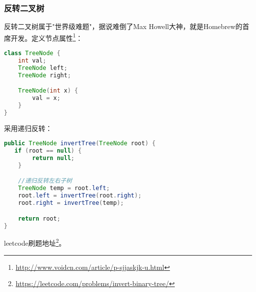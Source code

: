 \documentclass[../../../interview-questions.tex]{subfiles}
\begin{document}
\subsubsection{反转二叉树}

反转二叉树属于"世界级难题"，据说难倒了Max Howell大神，就是Homebrew的首席开发。定义节点属性\footnote{\url{http://www.voidcn.com/article/p-sjjaskjk-u.html}}：

\begin{lstlisting}[language=Java]
class TreeNode {
    int val;
    TreeNode left;
    TreeNode right;

    TreeNode(int x) {
        val = x;
    }
}
\end{lstlisting}

采用递归反转：

\begin{lstlisting}[language=Java]
public TreeNode invertTree(TreeNode root) {
   if (root == null) {
        return null;
    }

    //递归反转左右子树
    TreeNode temp = root.left;
    root.left = invertTree(root.right);
    root.right = invertTree(temp);

    return root; 
}
\end{lstlisting}

leetcode刷题地址\footnote{\url{https://leetcode.com/problems/invert-binary-tree/}}。
\end{document}
